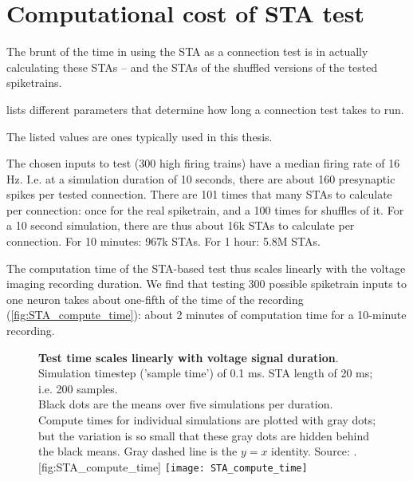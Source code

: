 \FloatBarrier
\section{Computational cost of STA test}

The brunt of the time in using the STA as a connection test is in actually calculating these STAs -- and the STAs of the shuffled versions of the tested spiketrains.

 lists different parameters that determine how long a connection test takes to run.

\begin{table}
    
    {The listed values are ones typically used in this thesis.}
    \label{tab:conntest-time-factors}
\end{table}


The chosen inputs to test (300 high firing trains) have a median firing rate of 16 Hz. I.e. at a simulation duration of 10 seconds, there are about 160 presynaptic spikes per tested connection. There are 101 times that many STAs to calculate per connection: once for the real spiketrain, and a 100 times for shuffles of it. For a 10 second simulation, there are thus about 16k STAs to calculate per connection.
For 10 minutes: 967k STAs. For 1 hour: 5.8M STAs.

The computation time of the STA-based test thus scales linearly with the voltage imaging recording duration. We find that testing 300 possible spiketrain inputs to one neuron takes about one-fifth of the time of the recording (\cref{fig:STA_compute_time}): about 2 minutes of computation time for a 10-minute recording.

\begin{figure}
    \begin{sidecaption}
        {\textbf{Test time scales linearly with voltage signal duration}.\\
        Simulation timestep ('sample time') of 0.1 ms. STA length of 20 ms; i.e. 200 samples.\\
        Black dots are the means over five simulations per duration. Compute times for individual simulations are plotted with gray dots; but the variation is so small that these gray dots are hidden behind the black means. Gray dashed line is the $y = x$ identity.  Source: .}
        [fig:STA_compute_time]
        \texttt{[image: STA\_compute\_time]}
    \end{sidecaption}
\end{figure}


